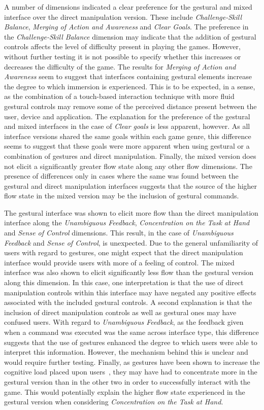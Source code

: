 A number of dimensions indicated a clear preference for the gestural and mixed interface over the direct manipulation version. These include \emph{Challenge-Skill Balance}, \emph{Merging of Action and Awareness} and \emph{Clear Goals}. The preference in the \emph{Challenge-Skill Balance} dimension may indicate that the addition of gestural controls affects the level of difficulty present in playing the games. However, without further testing it is not possible to specify whether this increases or decreases the difficulty of the game. The results for \emph{Merging of Action and Awareness} seem to suggest that interfaces containing gestural elements increase the degree to which immersion is experienced. This is to be expected, in a sense, as the combination of a touch-based interaction technique with more fluid gestural controls may remove some of the perceived distance present between the user, device and application. The explanation for the preference of the gestural and mixed interfaces in the case of \emph{Clear goals} is less apparent, however. As all interface versions shared the same goals within each game genre, this difference seems to suggest that these goals were more apparent when using gestural or a combination of gestures and direct manipulation. Finally, the mixed version does not elicit a significantly greater flow state along any other flow dimensions. The presence of differences only in cases where the same was found between the gestural and direct manipulation interfaces suggests that the source of the higher flow state in the mixed version may be the inclusion of gestural commands. 

The gestural interface was shown to elicit more flow than the direct manipulation interface along the \emph{Unambiguous Feedback}, \emph{Concentration on the Task at Hand} and \emph{Sense of Control} dimensions. This result, in the case of \emph{Unambiguous Feedback} and \emph{Sense of Control}, is unexpected. Due to the general unfamiliarity of users with regard to gestures, one might expect that the direct manipulation interface would provide users with more of a feeling of control. The mixed interface was also shown to elicit significantly less flow than the gestural version along this dimension. In this case, one interpretation is that the use of direct manipulation controls within this interface may have negated any positive effects associated with the included gestural controls. A second explanation is that the inclusion of direct manipulation controls as well as gestural ones may have confused users. With regard to \emph{Unambiguous Feedback}, as the feedback given when a command was executed was the same across interface type, this difference suggests that the use of gestures enhanced the degree to which users were able to interpret this information. However, the mechanism behind this is unclear and would require further testing. Finally, as gestures have been shown to increase the cognitive load placed upon users~\citep{Niel04}, they may have had to concentrate more in the gestural version than in the other two in order to successfully interact with the game. This would potentially explain the higher flow state experienced in the gestural version when considering \emph{Concentration on the Task at Hand}.

